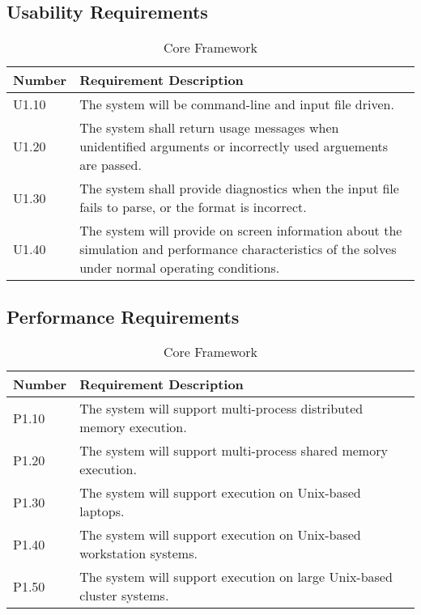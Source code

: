 \documentclass{INLreport}
\begin{document}
\subsection{Usability Requirements}

\begin{table}[!htbp]
  \caption{Core Framework\label{tab:usabilty_core}}
  \setcounter{UseFirstTableCounter}{1}
  \begin{tabular}{|l|p{12cm}|}
    \rowcolor{gray}
    Number & Requirement Description \\ \hline
    U1.10 & The system will be command-line and input file driven. \\ \hline
    U1.20 & The system shall return usage messages when unidentified arguments or incorrectly used arguements are passed. \\ \hline
    U1.30 & The system shall provide diagnostics when the input file fails to parse, or the format is incorrect. \\ \hline
    U1.40 & The system will provide on screen information about the simulation and performance characteristics of the solves under normal operating conditions. \\ \hline
  \end{tabular}
\end{table}

\clearpage

    \subsection{Performance Requirements}

\begin{table}[!htbp]
  \caption{Core Framework\label{tab:perf_core}}
  \setcounter{PerfFirstTableCounter}{1}
  \begin{tabular}{|l|p{12cm}|}
    \rowcolor{gray}
    Number & Requirement Description \\ \hline
    P1.10 & The system will support multi-process distributed memory execution. \\ \hline
    P1.20 & The system will support multi-process shared memory execution. \\ \hline
    P1.30 & The system will support execution on Unix-based laptops. \\ \hline
    P1.40 & The system will support execution on Unix-based workstation systems. \\ \hline
    P1.50 & The system will support execution on large Unix-based cluster systems. \\ \hline
  \end{tabular}
\end{table}
\end{document}
